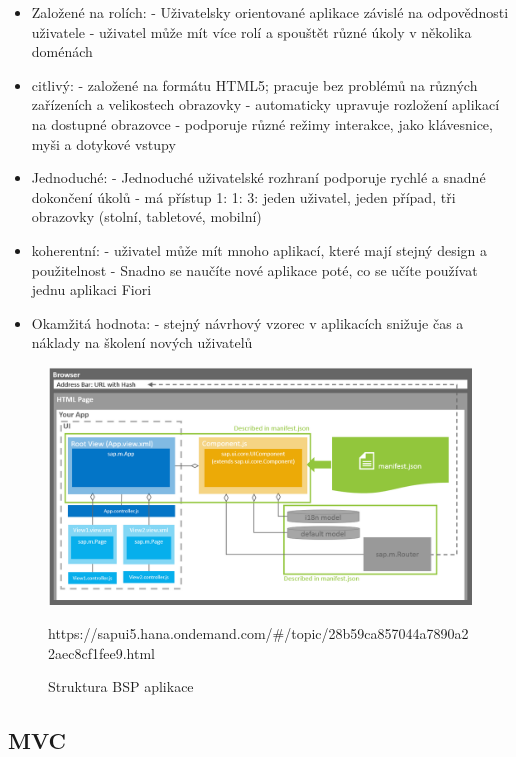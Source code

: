 \documentclass[thesis=M,czech]{FITthesis}[2012/06/26]
\begin{document}
\begin{itemize}
	\item
	Založené na rolích:
	- Uživatelsky orientované aplikace závislé na odpovědnosti uživatele
	- uživatel může mít více rolí a spouštět různé úkoly v několika doménách
	\item
	citlivý:
	- založené na formátu HTML5; pracuje bez problémů na různých zařízeních a velikostech obrazovky
	- automaticky upravuje rozložení aplikací na dostupné obrazovce
	- podporuje různé režimy interakce, jako klávesnice, myši a dotykové vstupy
	\item
	Jednoduché:
	- Jednoduché uživatelské rozhraní podporuje rychlé a snadné dokončení úkolů
	- má přístup 1: 1: 3: jeden uživatel, jeden případ, tři obrazovky (stolní, tabletové, mobilní)
	\item
	koherentní:
	- uživatel může mít mnoho aplikací, které mají stejný design a použitelnost
	- Snadno se naučíte nové aplikace poté, co se učíte používat jednu aplikaci Fiori
	\item
	Okamžitá hodnota:
	- stejný návrhový vzorec v aplikacích snižuje čas a náklady na školení nových uživatelů
\end{itemize} 	

\begin{figure}[H]
	\centering
	\includegraphics[width=1\textwidth]{images/fiori_arch.png}
	\caption{Struktura BSP aplikace}
	\label{img:fiori_arch}
	\small{ https://sapui5.hana.ondemand.com/\#/topic/28b59ca857044a7890a22aec8cf1fee9.html }
\end{figure}

\subsection{MVC}
\end{document}

